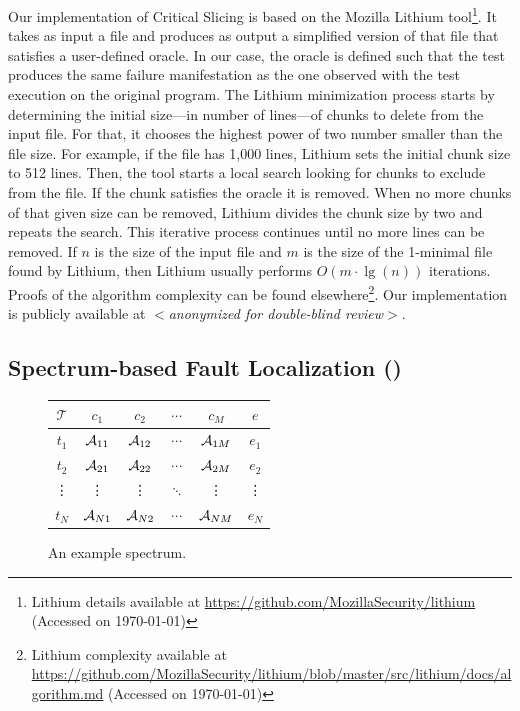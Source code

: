 \documentclass{article}
\begin{document}
Our implementation of Critical Slicing is based on the Mozilla Lithium
tool\footnote{Lithium details available at \url{https://github.com/MozillaSecurity/lithium}
(Accessed on \today)}. It takes as input a file
and produces as output a simplified version of that file that
satisfies a user-defined oracle. In our case, the oracle is defined
such that the test produces the same failure manifestation as the one
observed with the test execution on the original program. The
Lithium minimization process starts by determining the initial size---in
number of lines---of chunks to delete from the input file. For that,
it chooses the highest power of two number smaller than the file
size. For example, if the file has 1,000 lines, Lithium sets the
initial chunk size to 512 lines. Then, the tool starts a local search looking
for chunks to exclude from the file. If the chunk satisfies the oracle it is removed.
When no more chunks of that given size can be removed, Lithium
divides the chunk size by two and repeats the search. This iterative
process continues until no more lines can be removed.  If $n$ is the
size of the input file and $m$ is the size of the 1-minimal file found
by Lithium, then Lithium usually performs $O(m\cdot\lg(n))$
iterations. Proofs of the algorithm complexity can be found
elsewhere\footnote{Lithium complexity available at \url{https://github.com/MozillaSecurity/lithium/blob/master/src/lithium/docs/algorithm.md} (Accessed on \today)}. Our implementation is publicly
available at \textit{$<$anonymized for double-blind review$>$}.

\subsection{Spectrum-based Fault Localization (\sfl)}
\label{sec:sfl}

\begin{figure}
  \hspace{-2ex}
  \centering
  \scriptsize
  \begin{tabular}{c|cccc|c}
    $\mathcal{T}$ & $c_1$    & $c_2$    & $\cdots$ & $c_M$    & $e$    \\ \hline
    $t_1$         & $\mathcal{A}_{11}$ & $\mathcal{A}_{12}$ & $\cdots$ & $\mathcal{A}_{1M}$ & $e_1$  \\
    $t_2$         & $\mathcal{A}_{21}$ & $\mathcal{A}_{22}$ & $\cdots$ & $\mathcal{A}_{2M}$ & $e_2$  \\
    \vdots        & \vdots   & \vdots   & $\ddots$ & \vdots   & \vdots \\
    $t_N$         & $\mathcal{A}_{N1}$ & $\mathcal{A}_{N2}$ & $\cdots$ & $\mathcal{A}_{NM}$ & $e_N$  \\
  \end{tabular}
  \caption{An example spectrum.}
  \label{fig:spectrum-example}
\end{figure}
\end{document}
